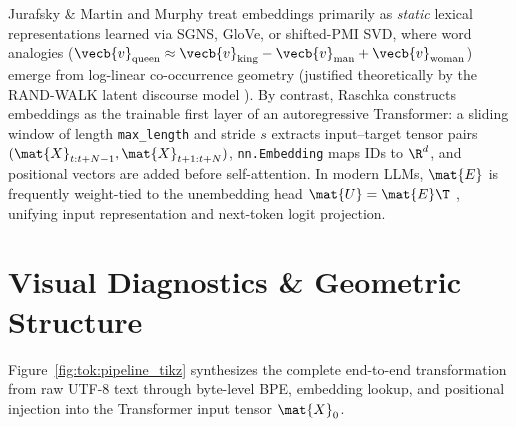 \documentclass[../../../../master.tex]{subfiles}
\begin{document}
\begin{crossbook}
Jurafsky \& Martin  and Murphy  treat embeddings primarily as \emph{static} lexical representations learned via SGNS, GloVe, or shifted-PMI SVD, where word analogies ($\vecb{v}_{\text{queen}} \approx \vecb{v}_{\text{king}} - \vecb{v}_{\text{man}} + \vecb{v}_{\text{woman}}$) emerge from log-linear co-occurrence geometry (justified theoretically by the RAND-WALK latent discourse model ). By contrast, Raschka  constructs embeddings as the trainable first layer of an autoregressive Transformer: a sliding window of length \texttt{max\_length} and stride $s$ extracts input--target tensor pairs $(\mat{X}_{t:t+N-1}, \mat{X}_{t+1:t+N})$, \texttt{nn.Embedding} maps IDs to $\R^d$, and positional vectors are added before self-attention. In modern LLMs, $\mat{E}$ is frequently weight-tied to the unembedding head $\mat{U} = \mat{E}\T$ , unifying input representation and next-token logit projection.
\end{crossbook}

\section{Visual Diagnostics \& Geometric Structure}
\label{sec:tok:visuals}

Figure~\ref{fig:tok:pipeline_tikz} synthesizes the complete end-to-end transformation from raw UTF-8 text through byte-level BPE, embedding lookup, and positional injection into the Transformer input tensor $\mat{X}_0$.
\end{document}
